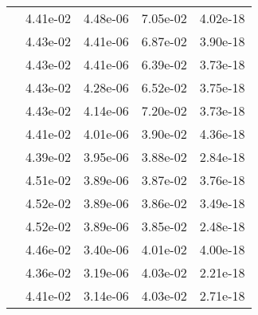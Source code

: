 \begin{table}
\begin{tabular}{c|cc|cc|}
\multicolumn{1}{|c|}{} & \multicolumn{1}{|c|}{  4.41e-02} & \multicolumn{1}{|c|}{  4.48e-06} & \multicolumn{1}{|c|}{  7.05e-02} & \multicolumn{1}{|c|}{  4.02e-18} \\ 
\multicolumn{1}{|c|}{} & \multicolumn{1}{|c|}{  4.43e-02} & \multicolumn{1}{|c|}{  4.41e-06} & \multicolumn{1}{|c|}{  6.87e-02} & \multicolumn{1}{|c|}{  3.90e-18} \\ 
\multicolumn{1}{|c|}{} & \multicolumn{1}{|c|}{  4.43e-02} & \multicolumn{1}{|c|}{  4.41e-06} & \multicolumn{1}{|c|}{  6.39e-02} & \multicolumn{1}{|c|}{  3.73e-18} \\ 
\multicolumn{1}{|c|}{} & \multicolumn{1}{|c|}{  4.43e-02} & \multicolumn{1}{|c|}{  4.28e-06} & \multicolumn{1}{|c|}{  6.52e-02} & \multicolumn{1}{|c|}{  3.75e-18} \\ 
\multicolumn{1}{|c|}{} & \multicolumn{1}{|c|}{  4.43e-02} & \multicolumn{1}{|c|}{  4.14e-06} & \multicolumn{1}{|c|}{  7.20e-02} & \multicolumn{1}{|c|}{  3.73e-18} \\ 
\multicolumn{1}{|c|}{} & \multicolumn{1}{|c|}{  4.41e-02} & \multicolumn{1}{|c|}{  4.01e-06} & \multicolumn{1}{|c|}{  3.90e-02} & \multicolumn{1}{|c|}{  4.36e-18} \\ 
\multicolumn{1}{|c|}{} & \multicolumn{1}{|c|}{  4.39e-02} & \multicolumn{1}{|c|}{  3.95e-06} & \multicolumn{1}{|c|}{  3.88e-02} & \multicolumn{1}{|c|}{  2.84e-18} \\ 
\multicolumn{1}{|c|}{} & \multicolumn{1}{|c|}{  4.51e-02} & \multicolumn{1}{|c|}{  3.89e-06} & \multicolumn{1}{|c|}{  3.87e-02} & \multicolumn{1}{|c|}{  3.76e-18} \\ 
\multicolumn{1}{|c|}{} & \multicolumn{1}{|c|}{  4.52e-02} & \multicolumn{1}{|c|}{  3.89e-06} & \multicolumn{1}{|c|}{  3.86e-02} & \multicolumn{1}{|c|}{  3.49e-18} \\ 
\multicolumn{1}{|c|}{} & \multicolumn{1}{|c|}{  4.52e-02} & \multicolumn{1}{|c|}{  3.89e-06} & \multicolumn{1}{|c|}{  3.85e-02} & \multicolumn{1}{|c|}{  2.48e-18} \\ 
\multicolumn{1}{|c|}{} & \multicolumn{1}{|c|}{  4.46e-02} & \multicolumn{1}{|c|}{  3.40e-06} & \multicolumn{1}{|c|}{  4.01e-02} & \multicolumn{1}{|c|}{  4.00e-18} \\ 
\multicolumn{1}{|c|}{} & \multicolumn{1}{|c|}{  4.36e-02} & \multicolumn{1}{|c|}{  3.19e-06} & \multicolumn{1}{|c|}{  4.03e-02} & \multicolumn{1}{|c|}{  2.21e-18} \\ 
\multicolumn{1}{|c|}{} & \multicolumn{1}{|c|}{  4.41e-02} & \multicolumn{1}{|c|}{  3.14e-06} & \multicolumn{1}{|c|}{  4.03e-02} & \multicolumn{1}{|c|}{  2.71e-18} \\ 

\end{tabular}
\end{table}
